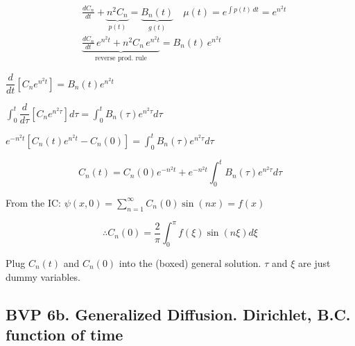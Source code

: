 \documentclass{report}
\begin{document}
$$
\begin{aligned}
& \frac{d C_n}{dt} + \underbrace{n^2 C_n}_{p(t)} = \underbrace{B_n(t)}_{g(t)} \quad \mu(t)= e^{\int p(t)\, dt} = e^{n^2 t} \\
& \underbrace{\frac{d C_n}{dt}\, e^{n^2 t} + n^2 C_n\, e^{n^2 t}}_{\text{reverse prod. rule}} = B_n(t)\, e^{n^2 t}
\end{aligned}
$$


$\dfrac{d}{d t}\left[C_{n} e^{n^{2}t}\right]=B_{n}(t) e^{n^{2} t}$

$\displaystyle\int_{0}^{t} \dfrac{d}{d \tau}\left[C_{n} e^{n^{2} \tau}\right] d \tau=\displaystyle\int_{0}^{t} B_{n}(\tau) e^{n^{2} \tau} d \tau$

$e^{-n^{2}t}\left[C_{n}(t) e^{n^{2} t}-C_{n}(0)\right]=\displaystyle\int_{0}^{t} B_{n}(\tau) e^{n^{2} \tau} d \tau$

$$
\boxed{C_{n}(t)=C_{n}(0) e^{-n^{2} t}+e^{-n^{2} t} \displaystyle\int_{0}^{t} B_{n}(\tau) e^{n^{2} \tau} d \tau}
$$

From the IC: $\psi(x, 0)=\sum\limits_{n=1}^{\infty} C_{n}(0) \sin (n x)=f(x)$

$$
\therefore \boxed{C_{n}(0)=\dfrac{2}{\pi} \displaystyle\int_{0}^{\pi} f(\xi) \sin (n\xi) d\xi}
$$

Plug $C_{n}(t)$ and $C_{n}(0)$ into the (boxed) general solution. $\tau$ and $\xi$ are just dummy variables.

\subsection{BVP 6b. Generalized Diffusion. Dirichlet, B.C. function of time}
\end{document}
